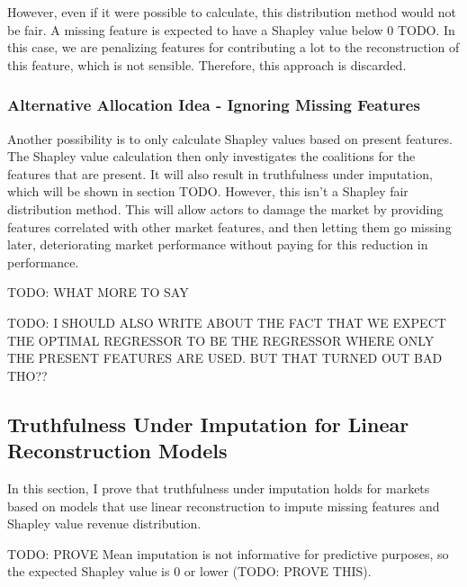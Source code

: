 However, even if it were possible to calculate, this distribution method would
not be fair. A missing feature is expected to have a Shapley value below 0
TODO. In this case, we are penalizing features for contributing a lot to the
reconstruction of this feature, which is not sensible. Therefore, this approach is discarded.

\subsubsection{Alternative Allocation Idea - Ignoring Missing Features}

Another possibility is to only calculate Shapley values based on present
features. The Shapley value calculation then only investigates the coalitions
for the features that are present. It will also result in truthfulness under
imputation, which will be shown in section TODO. However, this isn't a Shapley
fair distribution method. This will allow actors to damage the market by
providing features correlated with other market features, and then letting them
go missing later, deteriorating market performance without paying for this
reduction in performance.

TODO: WHAT MORE TO SAY

TODO: I SHOULD ALSO WRITE ABOUT THE FACT THAT WE EXPECT THE OPTIMAL REGRESSOR TO BE THE REGRESSOR WHERE ONLY THE PRESENT FEATURES ARE USED. BUT THAT TURNED OUT BAD THO??

\subsection{Truthfulness Under Imputation for Linear Reconstruction Models}

In this section, I prove that truthfulness under imputation holds for markets
based on models that use linear reconstruction to impute missing features and
Shapley value revenue distribution.

TODO: PROVE
Mean imputation is not informative for predictive purposes, so the expected
Shapley value is 0 or lower (TODO: PROVE THIS).
